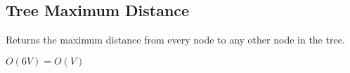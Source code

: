 \subsection{Tree Maximum Distance}

Returns the maximum distance from every node to any other node in the tree.

$O(6V) = O(V)$
